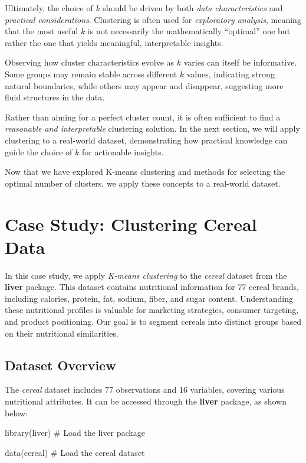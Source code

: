 \documentclass[
  11pt,
]{book}
\makeatletter
\newenvironment{Shaded}{}{}
\newcommand{\CommentTok}[1]{\textcolor[rgb]{0.36,0.36,0.36}{#1}}
\newcommand{\FunctionTok}[1]{#1}
\newcommand{\NormalTok}[1]{#1}
\newenvironment{kframe}{%
\medskip{}
\setlength{\fboxsep}{.8em}
 \def\at@end@of@kframe{}%
 \ifinner\ifhmode%
  \def\at@end@of@kframe{\end{minipage}}%
  \begin{minipage}{\columnwidth}%
 \fi\fi%
 \def\FrameCommand##1{\hskip\@totalleftmargin \hskip-\fboxsep
 \colorbox{shadecolor}{##1}\hskip-\fboxsep
     \hskip-\linewidth \hskip-\@totalleftmargin \hskip\columnwidth}%
 \MakeFramed {\advance\hsize-\width
   \@totalleftmargin\z@ \linewidth\hsize
   \@setminipage}}%
 {\par\unskip\endMakeFramed%
 \at@end@of@kframe}
\renewenvironment{Shaded}{\begin{kframe}}{\end{kframe}}
\theoremstyle{definition}
\theoremstyle{definition}
\theoremstyle{definition}
\theoremstyle{definition}
\theoremstyle{remark}
\makeatother
\begin{document}
Ultimately, the choice of \(k\) should be driven by both \emph{data characteristics} and \emph{practical considerations}. Clustering is often used for \emph{exploratory analysis}, meaning that the most useful \(k\) is not necessarily the mathematically ``optimal'' one but rather the one that yields meaningful, interpretable insights.

Observing how cluster characteristics evolve as \(k\) varies can itself be informative. Some groups may remain stable across different \(k\) values, indicating strong natural boundaries, while others may appear and disappear, suggesting more fluid structures in the data.

Rather than aiming for a perfect cluster count, it is often sufficient to find a \emph{reasonable and interpretable} clustering solution. In the next section, we will apply clustering to a real-world dataset, demonstrating how practical knowledge can guide the choice of \(k\) for actionable insights.

Now that we have explored K-means clustering and methods for selecting the optimal number of clusters, we apply these concepts to a real-world dataset.

\section{Case Study: Clustering Cereal Data}\label{kmeans-cereal}

In this case study, we apply \emph{K-means clustering} to the \emph{cereal} dataset from the \textbf{liver} package. This dataset contains nutritional information for 77 cereal brands, including calories, protein, fat, sodium, fiber, and sugar content. Understanding these nutritional profiles is valuable for marketing strategies, consumer targeting, and product positioning. Our goal is to segment cereals into distinct groups based on their nutritional similarities.

\subsection{Dataset Overview}\label{dataset-overview}

The \emph{cereal} dataset includes 77 observations and 16 variables, covering various nutritional attributes. It can be accessed through the \textbf{liver} package, as shown below:

\begin{Shaded}
\begin{Highlighting}[]
\FunctionTok{library}\NormalTok{(liver)  }\CommentTok{\# Load the liver package}

\FunctionTok{data}\NormalTok{(cereal)    }\CommentTok{\# Load the cereal dataset}
\end{Highlighting}
\end{Shaded}
\end{document}
